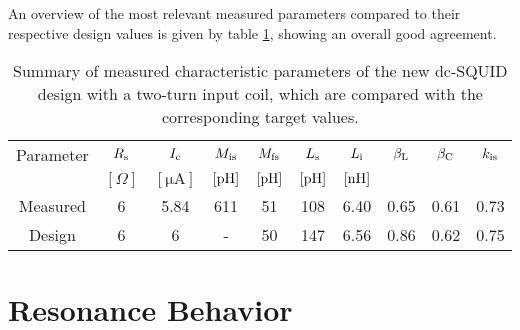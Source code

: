 An overview of the most relevant measured parameters compared to their respective design values is given by table \ref{tab:SQUIDparameters}, showing an overall good agreement.

\begin{table}[htb]
	\centering
	\begin{tabular}{c|*{9}{c}}
	\toprule
		Parameter & $R_{\rm s}$ & $I_{\rm c}$ & $M_{\rm is}$ & $M_{\rm fs}$ & $L_{\rm s}$ & $L_{\rm i}$ & $\beta_{\rm L}$ & $\beta_{\rm C}$ & $k_{\rm is}$ \\
		 & $[\Omega]$ & $[\unit{\micro\ampere}]$ & $[\unit{\pH}]$ & $[\unit{\pH}]$ & $[\unit{\pH}]$ & $[\unit{\nH}]$ &  &  &  \\
		\midrule
		Measured & 6 & 5.84 & 611 & 51 & 108 & 6.40 & 0.65 & 0.61 & 0.73 \\
		Design & 6 & 6 & - & 50 & 147 & 6.56 & 0.86 & 0.62 & 0.75 \\
	\end{tabular}
	\caption{Summary of measured characteristic parameters of the new dc-SQUID design with a two-turn input coil, which are compared with the corresponding target values.}
	\label{tab:SQUIDparameters}
\end{table}

\section{Resonance Behavior}\label{sec_resonance_results}


